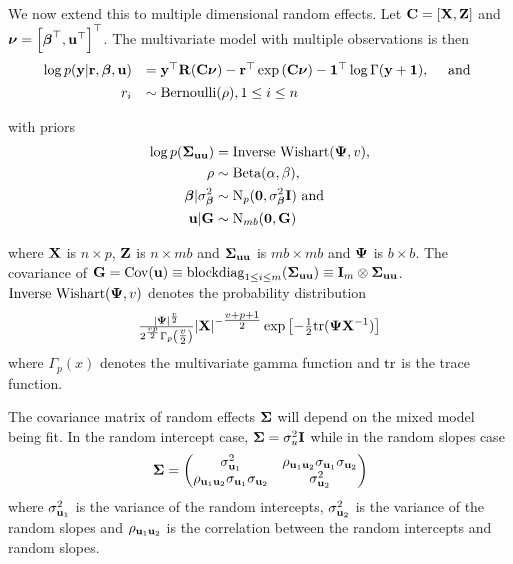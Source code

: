 \noindent We now extend this to multiple dimensional random effects. Let ${\bf C} =
[{\bf X}, {\bf Z}]$ and ${\boldsymbol \nu} = \left[ {\boldsymbol \beta}^\top, {\bf u}^\top \right]^\top$. The
multivariate model with multiple observations is then 
\begin{equation*}
    \begin{array}{rl} \log{p({\bf y}|{\bf r}, {\boldsymbol\beta}, {\bf u})} &= {\bf y}^\top {\bf R} ({\bf C}{\boldsymbol \nu})
        - {\bf r}^\top \exp{({\bf C}{\boldsymbol\nu})} - {\bf 1}^\top \log{\Gamma{({\bf y}+ {\bf1})}},
        \quad \mbox{ and } \\
        [1ex] r_i& \sim \text{Bernoulli}(\rho), 1 \leq i \leq n \\ 
    \end{array} 
\end{equation*}

\noindent with priors
\begin{align*}
	\log{p({\boldsymbol\Sigma}_{{\bf u}{\bf u}})} & = \text{Inverse Wishart}({\boldsymbol \Psi}, v),    \\
	\rho                       & \sim \text{Beta}(\alpha, \beta),             \\
	{\boldsymbol \beta}|\sigma^2_{\boldsymbol \beta}     & \sim \text{N}_p({\bf 0}, \sigma^2_{\boldsymbol \beta} {\bf I}) \text{ and } \\
	{\bf u}|{\bf G}       & \sim \text{N}_{mb}({\bf 0}, {\bf G})              
\end{align*}

\noindent where ${\bf X}$ is $n \times p$, ${\bf Z}$ is $n \times mb$ and ${\boldsymbol \Sigma}_{{\bf u}
{\bf u}}$ is $mb \times mb$ and ${\boldsymbol \Psi}$ is $b \times b$. The covariance of ${\bf G} =
\mbox{Cov}({\bf u}) \equiv \text{blockdiag}_{1 \leq i \leq m} ({\boldsymbol \Sigma}_{{\bf u} {\bf u}}) \equiv {\bf I}_m
\otimes {\boldsymbol\Sigma}_{{\bf u} {\bf u}}$. $\text{Inverse Wishart}({\boldsymbol \Psi}, v)$ denotes the
probability distribution
\begin{equation*}
\tfrac{|{\boldsymbol \Psi}|^\frac{v}{2}}{2^{\frac{vp}{2}}
\Gamma_p{\left(\tfrac{v}{2}\right)}} |{\bf X}|^{-\tfrac{v + p + 1}{2}}
\exp{\left[-\tfrac{1}{2} \text{tr}{({\boldsymbol\Psi}{\bf X}^{-1})}\right]}
\end{equation*}
where $\Gamma_p{(x)}$ denotes the multivariate gamma function and $\text{tr}$ is the
trace function.

The covariance matrix of random effects ${\boldsymbol \Sigma}$ will depend on the mixed
model being fit. In the random intercept case, ${\boldsymbol \Sigma} = \sigma_u^2 {\bf I}$ while
in the random slopes case
\[
	{\boldsymbol \Sigma} = 
	\begin{pmatrix}
		\sigma_{{\bf u}_1}^2                                 & \rho_{{\bf u}_1 {\bf u}_2} \sigma_{{\bf u}_1} \sigma_{{\bf u}_2} \\
		\rho_{{\bf u}_1 {\bf u}_2} \sigma_{{\bf u}_1} \sigma_{{\bf u}_2} & \sigma_{{\bf u}_2}^2                                 
	\end{pmatrix}
\]
where $\sigma_{{\bf u}_1}^2$ is the variance of the random intercepts,
$\sigma_{{\bf u}_2}^2$ is the variance of the random slopes and $\rho_{{\bf u}_1
{\bf u}_2}$ is the correlation between the random intercepts and random slopes.

